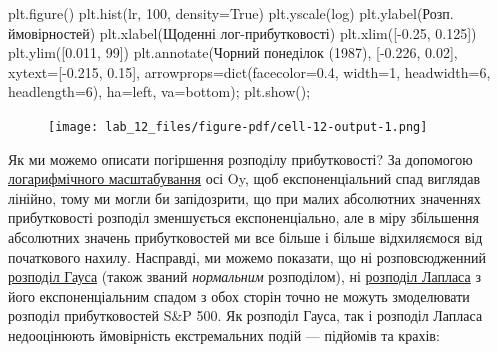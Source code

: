 \documentclass[
  letterpaper,
]{report}
\newenvironment{Shaded}{\begin{snugshade}}{\end{snugshade}}
\newcommand{\BuiltInTok}[1]{\textcolor[rgb]{0.00,0.23,0.31}{#1}}
\newcommand{\DecValTok}[1]{\textcolor[rgb]{0.68,0.00,0.00}{#1}}
\newcommand{\FloatTok}[1]{\textcolor[rgb]{0.68,0.00,0.00}{#1}}
\newcommand{\NormalTok}[1]{\textcolor[rgb]{0.00,0.23,0.31}{#1}}
\newcommand{\OperatorTok}[1]{\textcolor[rgb]{0.37,0.37,0.37}{#1}}
\newcommand{\StringTok}[1]{\textcolor[rgb]{0.13,0.47,0.30}{#1}}
\newcommand{\VariableTok}[1]{\textcolor[rgb]{0.07,0.07,0.07}{#1}}
\begin{document}
\begin{Shaded}
\begin{Highlighting}[]
\NormalTok{plt.figure()}
\NormalTok{plt.hist(lr, }\DecValTok{100}\NormalTok{, density}\OperatorTok{=}\VariableTok{True}\NormalTok{)}
\NormalTok{plt.yscale(}\StringTok{\textquotesingle{}log\textquotesingle{}}\NormalTok{)}
\NormalTok{plt.ylabel(}\StringTok{\textquotesingle{}Розп. ймовірностей\textquotesingle{}}\NormalTok{)}
\NormalTok{plt.xlabel(}\StringTok{\textquotesingle{}Щоденні лог{-}прибутковості\textquotesingle{}}\NormalTok{)}
\NormalTok{plt.xlim([}\OperatorTok{{-}}\FloatTok{0.25}\NormalTok{, }\FloatTok{0.125}\NormalTok{])}
\NormalTok{plt.ylim([}\FloatTok{0.011}\NormalTok{, }\DecValTok{99}\NormalTok{])}
\NormalTok{plt.annotate(}\StringTok{\textquotesingle{}Чорний понеділок (1987)\textquotesingle{}}\NormalTok{, [}\OperatorTok{{-}}\FloatTok{0.226}\NormalTok{, }\FloatTok{0.02}\NormalTok{], xytext}\OperatorTok{=}\NormalTok{[}\OperatorTok{{-}}\FloatTok{0.215}\NormalTok{, }\FloatTok{0.15}\NormalTok{],}
\NormalTok{             arrowprops}\OperatorTok{=}\BuiltInTok{dict}\NormalTok{(facecolor}\OperatorTok{=}\StringTok{\textquotesingle{}0.4\textquotesingle{}}\NormalTok{, width}\OperatorTok{=}\DecValTok{1}\NormalTok{, headwidth}\OperatorTok{=}\DecValTok{6}\NormalTok{, headlength}\OperatorTok{=}\DecValTok{6}\NormalTok{),}
\NormalTok{             ha}\OperatorTok{=}\StringTok{\textquotesingle{}left\textquotesingle{}}\NormalTok{, va}\OperatorTok{=}\StringTok{\textquotesingle{}bottom\textquotesingle{}}\NormalTok{)}\OperatorTok{;}
\NormalTok{plt.show()}\OperatorTok{;}
\end{Highlighting}
\end{Shaded}

\begin{figure}[H]

{\centering \texttt{[image: lab\_12\_files/figure-pdf/cell-12-output-1.png]}

}

\end{figure}

Як ми можемо описати погіршення розподілу прибутковості? За допомогою
\href{https://en.wikipedia.org/wiki/Logarithmic_scale}{логарифмічного
масштабування} осі Oy, щоб експоненціальний спад виглядав лінійно, тому
ми могли би запідозрити, що при малих абсолютних значеннях прибутковості
розподіл зменшується експоненціально, але в міру збільшення абсолютних
значень прибутковостей ми все більше і більше відхиляємося від
початкового нахилу. Насправді, ми можемо показати, що ні розповсюдженний
\href{https://en.wikipedia.org/wiki/Normal_distribution}{розподіл Гауса}
(також званий \emph{нормальним} розподілом), ні
\href{https://en.wikipedia.org/wiki/Laplace_distribution}{розподіл
Лапласа} з його експоненціальним спадом з обох сторін точно не можуть
змоделювати розподіл прибутковостей S\&P 500. Як розподіл Гауса, так і
розподіл Лапласа недооцінюють ймовірність екстремальних подій ---
підйомів та крахів:
\end{document}
